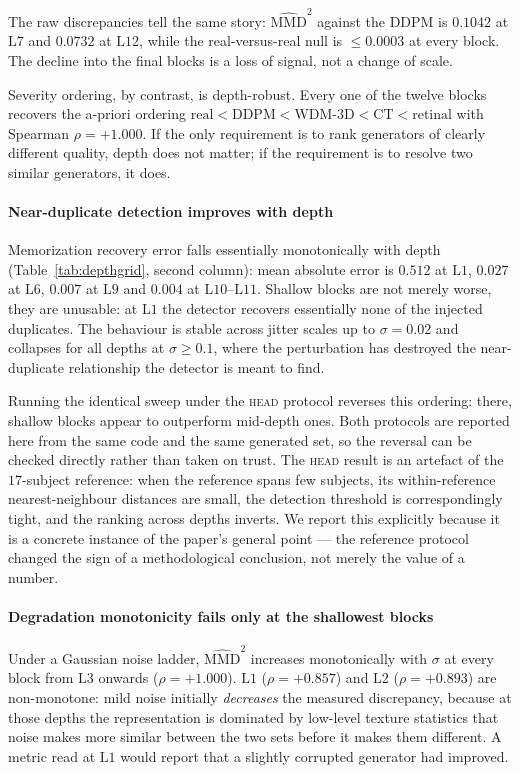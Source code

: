 \documentclass[preprint,12pt,authoryear]{elsarticle}
\newcommand{\mmd}{\mathrm{MMD}}
\newcommand{\Lb}[1]{\ensuremath{\mathrm{L}#1}}
\begin{document}
The raw discrepancies tell the same story: $\widehat{\mmd}^2$ against the DDPM
is $0.1042$ at \Lb{7} and $0.0732$ at \Lb{12}, while the real-versus-real null
is $\le 0.0003$ at every block. The decline into the final blocks is a loss of
signal, not a change of scale.

Severity ordering, by contrast, is depth-robust. Every one of the twelve blocks
recovers the a-priori ordering
$\text{real} < \text{DDPM} < \text{WDM-3D} < \text{CT} < \text{retinal}$ with
Spearman $\rho = +1.000$. If the only requirement is to rank generators of
clearly different quality, depth does not matter; if the requirement is to
resolve two similar generators, it does.

\paragraph{Near-duplicate detection improves with depth}
Memorization recovery error falls essentially monotonically with depth
(Table~\ref{tab:depthgrid}, second column): mean absolute error is $0.512$ at
\Lb{1}, $0.027$ at \Lb{6}, $0.007$ at \Lb{9} and $0.004$ at \Lb{10}--\Lb{11}.
Shallow blocks are not merely worse, they are unusable: at \Lb{1} the detector
recovers essentially none of the injected duplicates. The behaviour is stable
across jitter scales up to $\sigma = 0.02$ and collapses for all depths at
$\sigma \ge 0.1$, where the perturbation has destroyed the near-duplicate
relationship the detector is meant to find.

Running the identical sweep under the \textsc{head} protocol reverses this
ordering: there, shallow blocks appear to outperform mid-depth ones. Both
protocols are reported here from the same code and the same generated set, so
the reversal can be checked directly rather than taken on trust. The
\textsc{head} result is an artefact of the $17$-subject reference: when the reference spans few subjects, its
within-reference nearest-neighbour distances are small, the detection threshold
is correspondingly tight, and the ranking across depths inverts. We report this
explicitly because it is a concrete instance of the paper's general point ---
the reference protocol changed the sign of a methodological conclusion, not
merely the value of a number.

\paragraph{Degradation monotonicity fails only at the shallowest blocks}
Under a Gaussian noise ladder, $\widehat{\mmd}^2$ increases monotonically with
$\sigma$ at every block from \Lb{3} onwards ($\rho = +1.000$). \Lb{1}
($\rho = +0.857$) and \Lb{2} ($\rho = +0.893$) are non-monotone: mild noise
initially \emph{decreases} the measured discrepancy, because at those depths the
representation is dominated by low-level texture statistics that noise makes
more similar between the two sets before it makes them different. A metric read
at \Lb{1} would report that a slightly corrupted generator had improved.
\end{document}
